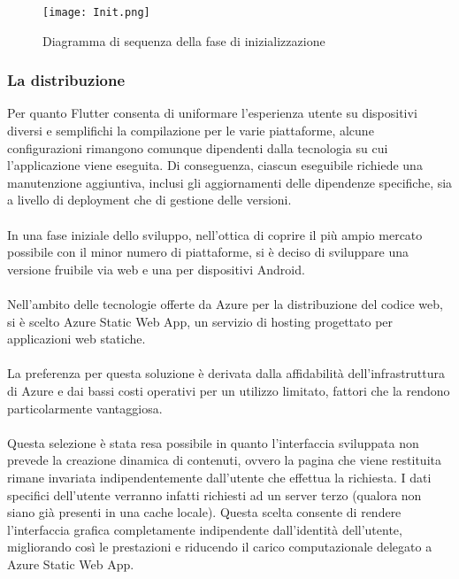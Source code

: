 \begin{figure}[h!]
    \begin{center}
        \texttt{[image: Init.png]}
        \caption{Diagramma di sequenza della fase di inizializzazione }
    \end{center}
\end{figure}


\clearpage

\subsubsection{La distribuzione}

Per quanto Flutter consenta di uniformare l'esperienza utente su dispositivi diversi e semplifichi la compilazione per le varie piattaforme,
alcune configurazioni rimangono comunque dipendenti dalla tecnologia su cui l'applicazione viene eseguita.
Di conseguenza, ciascun eseguibile richiede una manutenzione aggiuntiva, inclusi gli aggiornamenti delle dipendenze specifiche,
sia a livello di deployment che di gestione delle versioni.\\
\\
In una fase iniziale dello sviluppo, nell'ottica di coprire il più ampio mercato possibile con il minor numero di piattaforme,
si è deciso di sviluppare una versione fruibile via web e una per dispositivi Android.\\
\\
Nell'ambito delle tecnologie offerte da Azure per la  distribuzione del codice web, si è scelto Azure Static Web App, un servizio di hosting progettato per applicazioni web statiche. \\
\\
La preferenza per questa soluzione è derivata dalla affidabilità dell'infrastruttura di Azure e dai bassi costi operativi per un utilizzo limitato,
fattori che la rendono particolarmente vantaggiosa.\\
\\
Questa selezione è stata resa possibile in quanto l’interfaccia sviluppata non prevede la creazione dinamica di contenuti,
ovvero la pagina che viene restituita rimane invariata indipendentemente dall’utente che effettua la richiesta.
I dati specifici dell’utente verranno infatti richiesti ad un server terzo (qualora non siano già presenti in una cache locale).
Questa scelta consente di rendere l’interfaccia grafica completamente indipendente dall’identità dell’utente,
migliorando così le prestazioni e riducendo il carico computazionale delegato a Azure Static Web App.\\
